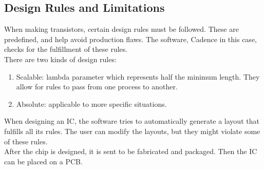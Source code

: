 \documentclass[nobib,fleqn,8pt]{article}
\begin{document}
\subsection{Design Rules and Limitations}
When making transistors, certain design rules must be followed. These are predefined, and help avoid production flaws. The software, Cadence in this case, checks for the fulfillment of these rules.\\
There are two kinds of design rules:
\begin{enumerate}
    \item Scalable: lambda parameter which represents half the minimum length. They allow for rules to pass from one process to another.
    \item Absolute: applicable to more specific situations.
\end{enumerate}
When designing an IC, the software tries to automatically generate a layout that fulfills all its rules. The user can modify the layouts, but they might violate some of these rules.\\
After the chip is designed, it is sent to be fabricated and packaged. Then the IC can be placed on a PCB.\\
\end{document}
